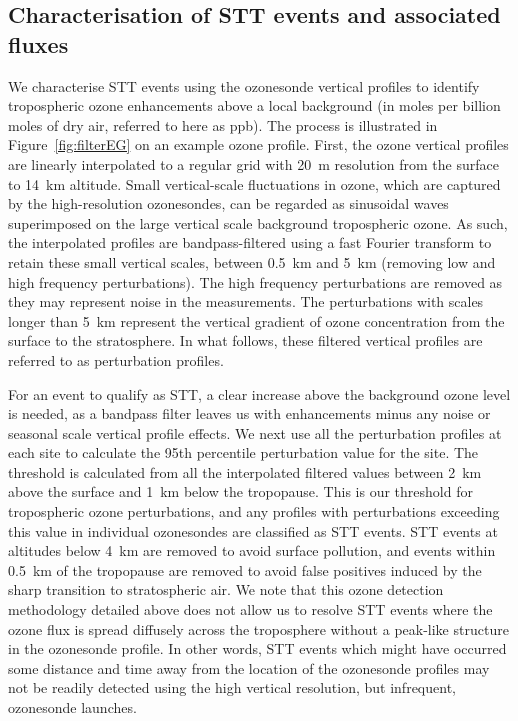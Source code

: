 \documentclass[acp, manuscript]{copernicus} %
\begin{document}
  \subsection{Characterisation of STT events and associated fluxes}
    \label{sec:CharacterisationOfSTTs}

    We characterise STT events using the ozonesonde vertical profiles to identify tropospheric ozone enhancements above a local background (in moles per billion moles of dry air, referred to here as ppb).
    The process is illustrated in Figure~\ref{fig:filterEG} on an example ozone profile.
    First, the ozone vertical profiles are linearly interpolated to a regular grid with 20~m resolution from the surface to 14~km altitude. 
    Small vertical-scale fluctuations in ozone, which are captured by the high-resolution ozonesondes, can be regarded as sinusoidal waves superimposed on the large vertical scale background tropospheric ozone.
    As such, the interpolated profiles are bandpass-filtered using a fast Fourier transform \citep{Press1992} to retain these small vertical scales, between 0.5~km and 5~km (removing low and high frequency perturbations).
    The high frequency perturbations are removed as they may represent noise in the measurements.
    The perturbations with scales longer than 5~km represent the vertical gradient of ozone concentration from the surface to the stratosphere.
    In what follows, these filtered vertical profiles are referred to as perturbation profiles.

    For an event to qualify as STT, a clear increase above the background ozone level is needed, as a bandpass filter leaves us with enhancements minus any noise or seasonal scale vertical profile effects.
    We next use all the perturbation profiles at each site to calculate the 95th percentile perturbation value for the site.
    The threshold is calculated from all the interpolated filtered values between 2~km above the surface and 1~km below the tropopause.
    This is our threshold for tropospheric ozone perturbations, and any profiles with perturbations exceeding this value in individual ozonesondes are classified as STT events.
    STT events at altitudes below 4~km are removed to avoid surface pollution, and events within 0.5~km of the tropopause are removed to avoid false positives induced by the sharp transition to stratospheric air.
    We note that this ozone detection methodology detailed above does not allow us to resolve STT events where the ozone flux is spread diffusely across the troposphere without a peak-like structure in the ozonesonde profile. 
    In other words, STT events which might have occurred some distance and time away from the location of the ozonesonde profiles may not be readily detected using the high vertical resolution, but infrequent, ozonesonde launches.
\end{document}
